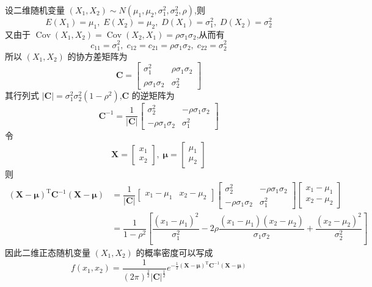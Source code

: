 设二维随机变量 $(X_1,X_2) \sim N(\mu_1,\mu_2,\sigma_1^2,\sigma_2^2,\rho)$,则
$$
E(X_1) = \mu_1, \; E(X_2) = \mu_2, \; D(X_1) = \sigma_1^2, \; D(X_2) = \sigma_2^2
$$
又由于 $\operatorname{Cov}(X_1,X_2) = \operatorname{Cov}(X_2,X_1) = \rho \sigma_1 \sigma_2$,从而有
$$
c_{11} = \sigma_1^2, \; c_{12} = c_{21} = \rho \sigma_1 \sigma_2, \; c_{22} = \sigma_2^2
$$
所以 $(X_1,X_2)$ 的协方差矩阵为
$$
\boldsymbol{C} = \begin{bmatrix}
    \sigma_1^2 & \rho \sigma_1 \sigma_2 \\
    \rho \sigma_1 \sigma_2 & \sigma_2^2
\end{bmatrix}
$$
其行列式 $|\boldsymbol{C}| = \sigma_1^2 \sigma_2^2 (1-\rho^2)$,$\boldsymbol{C}$ 的逆矩阵为
$$
\boldsymbol{C}^{-1} = \dfrac{1}{|\boldsymbol{C}|} \begin{bmatrix}
    \sigma_2^2 & -\rho \sigma_1 \sigma_2 \\
    -\rho \sigma_1 \sigma_2 & \sigma_1^2
\end{bmatrix}
$$
令
$$
\boldsymbol{X} = \begin{bmatrix}
    x_1 \\
    x_2
\end{bmatrix}, \;
\boldsymbol{\mu} = \begin{bmatrix}
    \mu_1 \\
    \mu_2
\end{bmatrix}
$$
则
$$
\begin{aligned}
    (\boldsymbol{X} - \boldsymbol{\mu})^{\text{T}} \boldsymbol{C}^{-1} (\boldsymbol{X} - \boldsymbol{\mu}) &= \dfrac{1}{|\boldsymbol{C}|}
    \begin{bmatrix}
        x_1-\mu_1 & x_2-\mu_2
    \end{bmatrix}
    \begin{bmatrix}
        \sigma_2^2 & -\rho \sigma_1 \sigma_2 \\
        -\rho \sigma_1 \sigma_2 & \sigma_1^2
    \end{bmatrix}
    \begin{bmatrix}
        x_1-\mu_1 \\
        x_2-\mu_2
    \end{bmatrix} \\
    &= \dfrac{1}{1-\rho^2} \left[ \dfrac{(x_1-\mu_1)^2}{\sigma_1^2} - 2\rho \dfrac{(x_1-\mu_1)(x_2-\mu_2)}{\sigma_1 \sigma_2} + \dfrac{(x_2-\mu_2)^2}{\sigma_2^2} \right]
\end{aligned}
$$
因此二维正态随机变量 $(X_1,X_2)$ 的概率密度可以写成
$$
f(x_1,x_2) = \dfrac{1}{(2\pi)^{\frac{2}{2}} |\boldsymbol{C}|^{\frac{1}{2}}} e^{-\frac{1}{2} (\boldsymbol{X} - \boldsymbol{\mu})^{\text{T}} \boldsymbol{C}^{-1} (\boldsymbol{X} - \boldsymbol{\mu})}
$$

